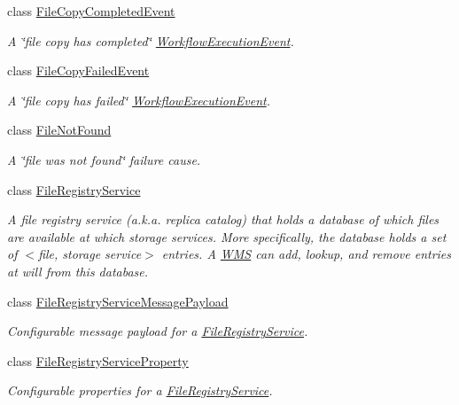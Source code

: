 \begin{DoxyCompactItemize}
class \hyperlink{classwrench_1_1_file_copy_completed_event}{File\+Copy\+Completed\+Event}
\begin{DoxyCompactList}\small\item\em A \char`\"{}file copy has completed\char`\"{} \hyperlink{classwrench_1_1_workflow_execution_event}{Workflow\+Execution\+Event}. \end{DoxyCompactList}\item 
class \hyperlink{classwrench_1_1_file_copy_failed_event}{File\+Copy\+Failed\+Event}
\begin{DoxyCompactList}\small\item\em A \char`\"{}file copy has failed\char`\"{} \hyperlink{classwrench_1_1_workflow_execution_event}{Workflow\+Execution\+Event}. \end{DoxyCompactList}\item 
class \hyperlink{classwrench_1_1_file_not_found}{File\+Not\+Found}
\begin{DoxyCompactList}\small\item\em A \char`\"{}file was not found\char`\"{} failure cause. \end{DoxyCompactList}\item 
class \hyperlink{classwrench_1_1_file_registry_service}{File\+Registry\+Service}
\begin{DoxyCompactList}\small\item\em A file registry service (a.\+k.\+a. replica catalog) that holds a database of which files are available at which storage services. More specifically, the database holds a set of $<$file, storage service$>$ entries. A \hyperlink{classwrench_1_1_w_m_s}{W\+MS} can add, lookup, and remove entries at will from this database. \end{DoxyCompactList}\item 
class \hyperlink{classwrench_1_1_file_registry_service_message_payload}{File\+Registry\+Service\+Message\+Payload}
\begin{DoxyCompactList}\small\item\em Configurable message payload for a \hyperlink{classwrench_1_1_file_registry_service}{File\+Registry\+Service}. \end{DoxyCompactList}\item 
class \hyperlink{classwrench_1_1_file_registry_service_property}{File\+Registry\+Service\+Property}
\begin{DoxyCompactList}\small\item\em Configurable properties for a \hyperlink{classwrench_1_1_file_registry_service}{File\+Registry\+Service}. \end{DoxyCompactList}\item 

\end{DoxyCompactItemize}
